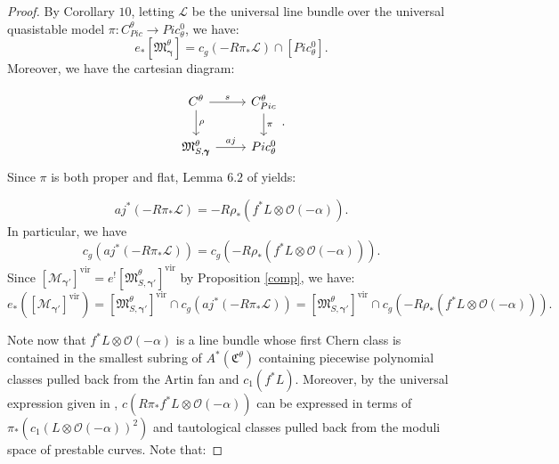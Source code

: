 \documentclass[12pt, oneside]{amsart}   	%
\newcommand{\vir}{\operatorname{vir}}
\numberwithin{equation}{section}
\numberwithin{thm}{section}
\numberwithin{figure}{section}
\begin{document}
\begin{proof}
By \cite{smstab} Corollary $10$, letting $\mathcal{L}$ be the universal line bundle over the universal quasistable model $\pi: C^\theta_{Pic} \rightarrow Pic^0_{\theta}$, we have:
\[ e_*[\mathfrak{M}_{\pmb\gamma}^{\theta}] = c_g(-R\pi_*\mathcal{L})\cap [Pic^{0}_{\theta}].\]
Moreover, we have the cartesian diagram:


\[\begin{tikzcd}
C^\theta \arrow[r,"s"] \arrow[d,"\rho"] & C^{\theta}_{Pic}\arrow[d,"\pi"] \\
\mathfrak{M}_{S,\pmb\gamma}^{\theta} \arrow[r,"aj"] & Pic^0_{\theta}
\end{tikzcd}.\]
Since $\pi$ is both proper and flat, Lemma $6.2$ of \cite{BNtaut} yields:


\[aj^*(-R\pi_*\mathcal{L})  = -R\rho_*(f^*L\otimes \mathcal{O}(-\alpha)).\]
In particular, we have 
\[c_g(aj^*(-R\pi_*\mathcal{L}))  = c_g(-R\rho_*(f^*L\otimes \mathcal{O}(-\alpha))).\]
Since $[\mathscr{M}_{\pmb\gamma'}]^{\vir} = e^![\mathfrak{M}_{S,\pmb\gamma'}^\theta]^{\vir}$ by Proposition \ref{comp}, we have:
\[e_*([\mathscr{M}_{\pmb\gamma'}]^{\vir}) = [\mathfrak{M}_{S,\pmb\gamma'}^{\theta}]^{\vir}\cap c_g(aj^*(-R\pi_*\mathcal{L})) = [\mathfrak{M}_{S,\pmb\gamma'}^{\theta}]^{\vir}\cap c_g(-R\rho_*(f^*L\otimes \mathcal{O}(-\alpha))).\]

Note now that $f^*L\otimes \mathcal{O}(-\alpha)$ is a line bundle whose first Chern class is contained in the smallest subring of $A^*(\mathfrak{C}^\theta)$ containing piecewise polynomial classes pulled back from the Artin fan and $c_1(f^*L)$. Moreover, by the universal expression given in \cite[Lemma $5.1$]{drroot}, $c(R\pi_*f^*L\otimes \mathcal{O}(-\alpha))$ can be expressed in terms of $\pi_*(c_1(L\otimes \mathcal{O}(-\alpha))^2)$ and tautological classes pulled back from the moduli space of prestable curves. Note that:


\end{proof}
\end{document}
